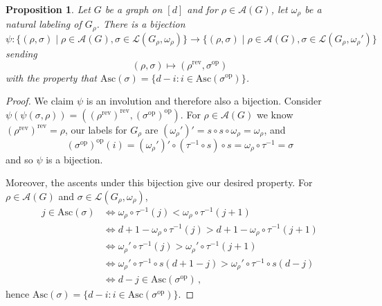 \documentclass[11pt]{amsart}
\newtheorem{proposition}[theorem]{Proposition}
\newcommand{\asc}{\mathrm{Asc}}
\newcommand{\rev}[1]{#1^{\mathrm{rev}}}
\newcommand{\op}[1]{#1^{\mathrm{op}}}
\newcommand{\acyclic}[1]{\mathcal{A}(#1)}
\newcommand{\jhset}[1]{\mathcal{L}(#1)}
\begin{document}
\begin{proposition}\label{prop:ascentopposite}
    Let $G$ be a graph on $[d]$ and for $\rho \in \acyclic{G}$, let $\omega_\rho$ be a natural labeling of $G_\rho$.
    There is a bijection 
    \[
        \psi: \{(\rho,\sigma) \mid \rho \in \mathcal{A}(G), \sigma \in \mathcal{L}(G_\rho,\omega_\rho) \} \to \{(\rho,\sigma) \mid \rho \in \mathcal{A}(G), \sigma \in \mathcal{L}(G_\rho,\omega_\rho') \}
        \]
        sending
        \[ (\rho,\sigma) \mapsto (\rev{\rho},\op{\sigma})
    \]
    with the property that $\asc(\sigma) = \{d-i: i \in \asc(\op{\sigma})\}$.
\end{proposition}
\begin{proof}   
    We claim $\psi$ is an involution and therefore also a bijection.
    Consider $\psi(\psi(\sigma,\rho)) =(\rev{(\rev{\rho})}, \op{(\op{\sigma})} )$.
    For $\rho \in \acyclic{G}$ we know $\rev{(\rev{\rho})} = \rho$, our labels for $G_\rho$ are $(\omega_\rho')' = s \circ s \circ \omega_\rho = \omega_\rho$, and
    \[
        \op{(\op{\sigma})}(i) = (\omega_\rho')' \circ (\tau^{-1} \circ s) \circ s = \omega_\rho \circ \tau^{-1} = \sigma
    \]
    and so $\psi$ is a bijection. 

    Moreover, the ascents under this bijection give our desired property. For $\rho \in \acyclic{G}$ and $\sigma \in \jhset{G_\rho,\omega_\rho}$,
    \begin{align*}
        j \in \asc(\sigma) &\Leftrightarrow \omega_\rho \circ \tau^{-1}(j) < \omega_\rho \circ \tau^{-1}(j+1) \\
        &\Leftrightarrow d+1 - \omega_\rho \circ \tau^{-1}(j) > d+1- \omega_\rho \circ \tau^{-1}(j+1) \\
        &\Leftrightarrow \omega_\rho' \circ \tau^{-1}(j) > \omega_\rho' \circ \tau^{-1}(j+1) \\
        &\Leftrightarrow \omega_\rho' \circ \tau^{-1} \circ s (d+1-j) > \omega_\rho' \circ \tau^{-1} \circ s (d-j) \\
        &\Leftrightarrow d-j \in \asc(\op{\sigma}) \, ,
    \end{align*} 
    hence $\asc(\sigma) = \{d-i: i \in \asc(\op{\sigma})\}$.
\end{proof}
\end{document}

